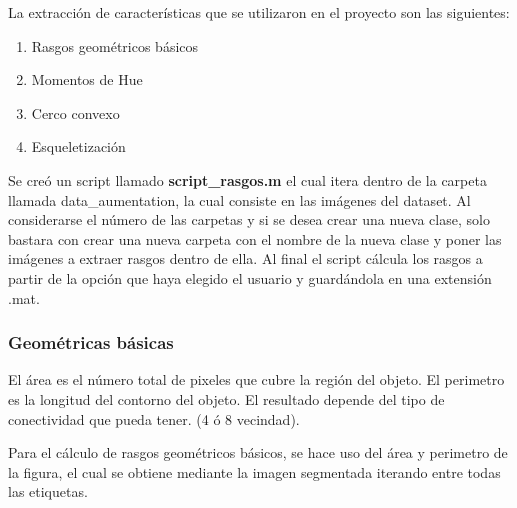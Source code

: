 \documentclass[a4paper, 11pt]{article}
\begin{document}
La extracción de características que se utilizaron en el proyecto son las siguientes:

\begin{enumerate}
\item Rasgos geométricos básicos
\item Momentos de Hue
\item Cerco convexo 
\item Esqueletización
\end{enumerate}

Se creó un script llamado \textbf{script\_rasgos.m} el cual itera dentro de la carpeta llamada data\_aumentation, la cual consiste en las imágenes del dataset. Al considerarse el número de las carpetas y si se desea crear una nueva clase, solo bastara con crear una nueva carpeta con el nombre de la nueva clase y poner las imágenes a extraer rasgos dentro de ella. Al final el script cálcula los rasgos a partir de la opción que haya elegido el usuario y guardándola en una extensión .mat.

\newpage
\subsubsection{Geométricas básicas}

El área es el número total de pixeles que cubre la región del objeto. El perimetro es la longitud del contorno del objeto. El resultado depende del tipo de conectividad que pueda tener. (4 ó 8 vecindad).

Para el cálculo de rasgos geométricos básicos, se hace uso del área y perimetro de la figura, el cual se obtiene mediante la imagen segmentada iterando entre todas las etiquetas.
\end{document}
